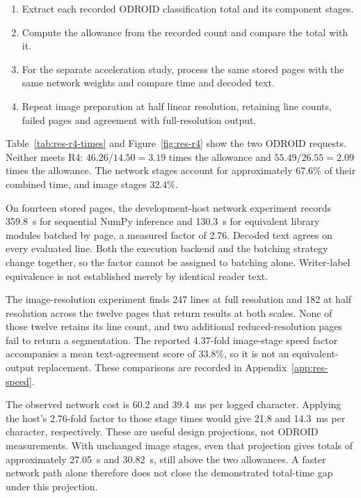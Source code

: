 \begin{enumerate}\setlength{\itemsep}{1pt}
\item Extract each recorded ODROID classification total and its component stages.
\item Compute the allowance from the recorded count and compare the total with it.
\item For the separate acceleration study, process the same stored pages with the same network weights and compare time and decoded text.
\item Repeat image preparation at half linear resolution, retaining line counts, failed pages and agreement with full-resolution output.
\end{enumerate}

Table~\ref{tab:res-r4-times} and Figure~\ref{fig:res-r4} show the two ODROID requests. Neither meets R4: $46.26/14.50=3.19$ times the allowance and $55.49/26.55=2.09$ times the allowance. The network stages account for approximately 67.6\% of their combined time, and image stages 32.4\%.



On fourteen stored pages, the development-host network experiment records 359.8~s for sequential NumPy inference and 130.3~s for equivalent library modules batched by page, a measured factor of 2.76. Decoded text agrees on every evaluated line. Both the execution backend and the batching strategy change together, so the factor cannot be assigned to batching alone. Writer-label equivalence is not established merely by identical reader text.

The image-resolution experiment finds 247 lines at full resolution and 182 at half resolution across the twelve pages that return results at both scales. None of those twelve retains its line count, and two additional reduced-resolution pages fail to return a segmentation. The reported 4.37-fold image-stage speed factor accompanies a mean text-agreement score of 33.8\%, so it is not an equivalent-output replacement. These comparisons are recorded in Appendix~\ref{app:res-speed}.

The observed network cost is 60.2 and 39.4~ms per logged character. Applying the host's 2.76-fold factor to those stage times would give 21.8 and 14.3~ms per character, respectively. These are useful design projections, not ODROID measurements. With unchanged image stages, even that projection gives totals of approximately 27.05~s and 30.82~s, still above the two allowances. A faster network path alone therefore does not close the demonstrated total-time gap under this projection.

